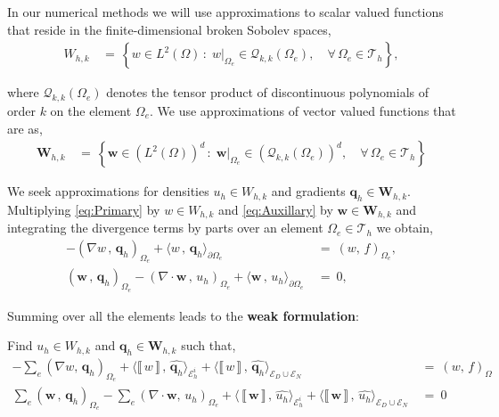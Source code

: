 \documentclass[12pt,letterpaper]{article}
\begin{document}
In our numerical methods we will use approximations to scalar valued functions that reside in the finite-dimensional broken Sobolev spaces,
\begin{align}
W_{h,k}
\, &= \, 
\left\{ w \in L^{2}(\Omega) \, : \; w  \vert_{\Omega_{e}} \in \mathcal{Q}_{k,k}(\Omega_{e}), \quad \forall \, \Omega_{e}  \in \mathcal{T}_{h}  \right\}, 
\end{align}

\noindent
where $\mathcal{Q}_{k,k}(\Omega_{e})$ denotes the tensor product of discontinuous polynomials of order $k$ on the element $\Omega_{e}$. We use approximations of vector valued functions that are as,
\begin{align}
\textbf{W}_{h,k} 
\, &= \, 
\left\{  \textbf{w}  \in \left(L^{2}(\Omega)\right)^{d} \, :
 \; \textbf{w}  \vert_{\Omega_{e}} \in \left( \mathcal{Q}_{k,k}(\Omega_{e}) \right)^{d}, \quad \forall \, \Omega_{e} \in  \mathcal{T}_{h} \right\}
\end{align}

\noindent
We seek approximations for densities $u_{h} \in W_{h,k}$ and gradients $\textbf{q}_{h}\in \textbf{W}_{h,k}$. Multiplying \eqref{eq:Primary} by $w \in W_{h,k}$ and \eqref{eq:Auxillary} by $\textbf{w} \in \textbf{W}_{h,k}$ and integrating the divergence terms by parts over an element $\Omega_{e} \in \mathcal{T}_{h}$ we obtain,
\begin{align}
-
\left( \nabla w  \, , \, \textbf{q}_{h}  \right)_{\Omega_{e}}
+
\langle w \, , \,  \textbf{q}_{h}  \rangle_{\partial \Omega_{e}} 
\ &= \
\left( w , \, f \right)_{\Omega_{e}} , \nonumber \\
\left( \textbf{w} \, , \, \textbf{q}_{h} \right)_{\Omega_{e}}
-
\left(  \nabla \cdot \textbf{w} \, , \,  u_{h} \right)_{\Omega_{e}}
+
\langle   \textbf{w}  \, ,   \, u_{h}
\rangle_{\partial \Omega_{e}} 
\ &= \
0 ,\nonumber
\end{align}

\noindent
Summing over all the elements leads to the \textbf{weak formulation}:

\vspace{2mm}

\noindent
Find $u_{h} \in W_{h,k}$ and $\textbf{q}_{h} \in  \textbf{W}_{h,k} $ such that,
\begin{align}
-
\sum_{e} \left( \nabla w,  \,  \textbf{q}_{h}  \right)_{\Omega_{e}}
 +
\langle  \llbracket \,  w \, \rrbracket \, , \,  \widehat{\textbf{q}_{h} } \rangle_{\mathcal{E}_{h}^{i} }
 +
\langle  \llbracket \,  w \, \rrbracket \, , \,  \widehat{\textbf{q}_{h} } \rangle_{\mathcal{E}_{D} \cup \mathcal{E}_{N}} \ &= \  
\left( w , \, f  \right)_{\Omega} \label{eq:LDG1}  \\
\sum_{e} \left( \textbf{w} \, , \, \textbf{q}_{h} \right)_{\Omega_{e}}
-
\sum_{e} \left(  \nabla \cdot \textbf{w} , \,  u_{h} \right)_{\Omega_{e}}
+  
\langle \, \llbracket \,  \textbf{w} \, \rrbracket \, ,   \, \widehat{u_{h}}
\rangle_{\mathcal{E}_{h}^{i}}
+ 
\langle  \llbracket \,  \textbf{w} \, \rrbracket \, , \,  \widehat{u_{h}}  \rangle_{\mathcal{E}_{D} \cup \mathcal{E}_{N}} \label{eq:LDG2}
\ &= \
0
\end{align}
\end{document}
